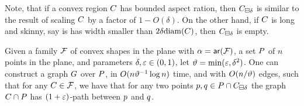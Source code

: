 \documentclass[12pt]{article}%
\begin{document}
Note, that if a convex region $C$ has bounded aspect ration, then
$C_{\boxminus \delta}$ is similar to the result of scaling $C$
by a factor of $1-O(\delta)$. On the other hand, if $C$ is long
and skinny, say is has width smaller than
$2 \delta \diameterX{\body}$, then $C_{\boxminus \delta}$ is
empty.


\begin{lemma}
    Given a family $\mathcal{F}$ of convex shapes in the plane with
    $\alpha = \arX{\FF}$, a set $P$ of $n$ points in the plane, and
    parameters $\delta, \varepsilon \in (0,1)$, let
    $\vartheta = \min( \varepsilon, \delta^2)$.  One can construct a graph $G$
    over $P$, in $O(n \vartheta^{-1} \log n)$ time, and with
    $O(n/\vartheta)$ edges, such that for any $C \in \mathcal{F}$, we have
    that for any two points
    $p, q \in P \cap C_{\boxminus \delta}$ the graph
    $C  \cap {P}$ has $(1+\varepsilon)$-path between $p$ and
    $q$.
\end{lemma}
\end{document}
